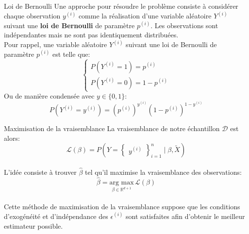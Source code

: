 \documentclass[10pt]{beamer}  %
\begin{document}
\begin{frame}{Loi de Bernoulli}
	Une approche pour résoudre le problème consiste à considérer chaque observation ${y^{(i)}}$ comme la réalisation d'une variable aléatoire $Y^{(i)}$ suivant une \textbf{loi de Bernoulli} de paramètre $p^{(i)}$. Les observations sont indépendantes mais ne sont pas identiquement distribuées.\\
	\vspace{0.5cm}
	\pause
	Pour rappel, une variable aléatoire $Y^{(i)}$ suivant une loi de Bernoulli de paramètre $p^{(i)}$ est telle que:
	\begin{equation}
		\begin{cases}
			P(Y^{(i)} = 1) = p^{(i)} \\
			P(Y^{(i)} = 0) = 1 - p^{(i)}
		\end{cases}
		\nonumber
	\end{equation}
	Ou de manière condensée avec $y \in \{0, 1\}$:
	\begin{equation}
		P(Y^{(i)} = y^{(i)}) = \left(p^{(i)}\right)^{y^{(i)}} \left(1 - p^{(i)}\right)^{1 - y^{(i)}}
		\nonumber
	\end{equation}
\end{frame}

\begin{frame}{Maximisation de la vraisemblance}
	La vraisemblance de notre échantillon $\mathcal{D}$ est alors:
	\begin{equation}
		\mathcal{L}(\beta) = P(Y = \begin{Bmatrix}y^{(i)}\end{Bmatrix}_{i=1}^n \mid \beta, \tilde{X})
		\nonumber
	\end{equation} \\
	\vspace{0.5cm}
	\pause
	L'idée consiste à trouver $\hat{\beta}$ tel qu'il maximise la vraisemblance des observations:
	\begin{equation}
		\hat{\beta} = \underset{\beta \in \mathbb{R}^{d+1}}{\text{arg max}} \, \mathcal{L}(\beta)
		\nonumber
	\end{equation} \\
	\vspace{0.5cm}
	\pause
	Cette méthode de maximisation de la vraisemblance suppose que les conditions d'exogénéité et d'indépendance des $\epsilon^{(i)}$ sont satisfaites afin d'obtenir le meilleur estimateur possible.
\end{frame}
\end{document}
